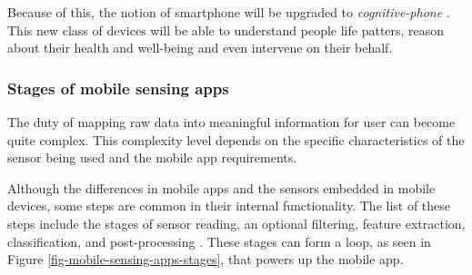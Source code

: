 Because of this, the notion of smartphone will be upgraded to \emph{cognitive-phone} \cite{Campbell2012}.
This new class of devices will be able to understand people life patters, reason about their health and well-being and even intervene on their behalf.


\subsubsection{Stages of mobile sensing apps}
\label{sub:stages_of_mobile_sensing_apps}

The duty of mapping raw data into meaningful information for user can become quite complex.
This complexity level depends on the specific characteristics of the sensor being used and the mobile app requirements.

Although the differences in mobile apps and the sensors embedded in mobile devices, some steps are common in their internal functionality.
The list of these steps include the stages of sensor reading, an optional filtering, feature extraction, classification, and post-processing \cite{Ra2012}.
These stages can form a loop, as seen in Figure \ref{fig-mobile-sensing-apps-stages}, that powers up the mobile app.

